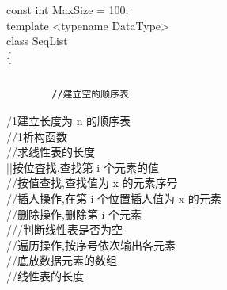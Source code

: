 \documentclass[10pt]{article}
\begin{document}
const int MaxSize = 100;\\
template <typename DataType>\\
class SeqList\\
\{

\begin{verbatim}

\end{verbatim}

\begin{verbatim}
        //建立空的顺序表
\end{verbatim}

/1建立长度为 n 的顺序表\\
//1析构函数\\
//求线性表的长度\\
||按位査找,查找第 i 个元素的值\\
//按值查找,查找值为 x 的元素序号\\
//插人操作,在第 i 个位置插人值为 x 的元素\\
//删除操作,删除第 i 个元素\\
///判断线性表是否为空\\
//遍历操作,按序号依次输出各元素\\
//底放数据元素的数组\\
//线性表的长度
\end{document}
